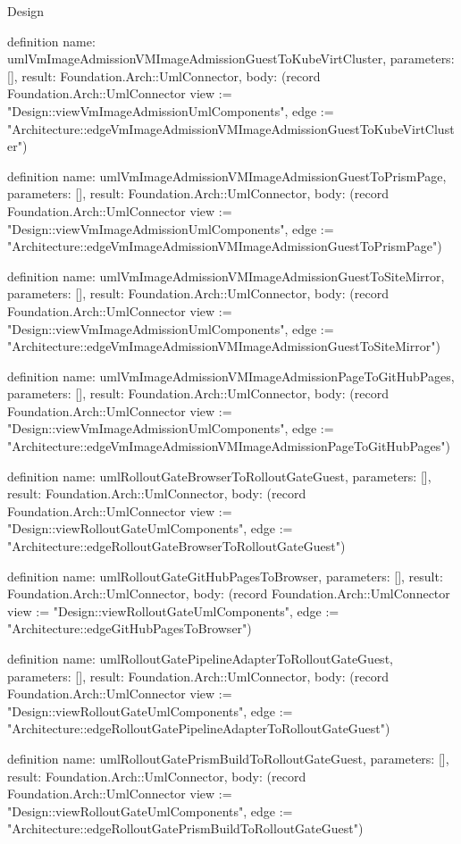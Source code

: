 \begin{lexlean}{Design}
\begin{semanticmodule}
definition{
  name: umlVmImageAdmissionVMImageAdmissionGuestToKubeVirtCluster,
  parameters: [],
  result: Foundation.Arch::UmlConnector,
  body: (record Foundation.Arch::UmlConnector {view := "Design::viewVmImageAdmissionUmlComponents", edge := "Architecture::edgeVmImageAdmissionVMImageAdmissionGuestToKubeVirtCluster"})
}

definition{
  name: umlVmImageAdmissionVMImageAdmissionGuestToPrismPage,
  parameters: [],
  result: Foundation.Arch::UmlConnector,
  body: (record Foundation.Arch::UmlConnector {view := "Design::viewVmImageAdmissionUmlComponents", edge := "Architecture::edgeVmImageAdmissionVMImageAdmissionGuestToPrismPage"})
}

definition{
  name: umlVmImageAdmissionVMImageAdmissionGuestToSiteMirror,
  parameters: [],
  result: Foundation.Arch::UmlConnector,
  body: (record Foundation.Arch::UmlConnector {view := "Design::viewVmImageAdmissionUmlComponents", edge := "Architecture::edgeVmImageAdmissionVMImageAdmissionGuestToSiteMirror"})
}

definition{
  name: umlVmImageAdmissionVMImageAdmissionPageToGitHubPages,
  parameters: [],
  result: Foundation.Arch::UmlConnector,
  body: (record Foundation.Arch::UmlConnector {view := "Design::viewVmImageAdmissionUmlComponents", edge := "Architecture::edgeVmImageAdmissionVMImageAdmissionPageToGitHubPages"})
}

definition{
  name: umlRolloutGateBrowserToRolloutGateGuest,
  parameters: [],
  result: Foundation.Arch::UmlConnector,
  body: (record Foundation.Arch::UmlConnector {view := "Design::viewRolloutGateUmlComponents", edge := "Architecture::edgeRolloutGateBrowserToRolloutGateGuest"})
}

definition{
  name: umlRolloutGateGitHubPagesToBrowser,
  parameters: [],
  result: Foundation.Arch::UmlConnector,
  body: (record Foundation.Arch::UmlConnector {view := "Design::viewRolloutGateUmlComponents", edge := "Architecture::edgeGitHubPagesToBrowser"})
}

definition{
  name: umlRolloutGatePipelineAdapterToRolloutGateGuest,
  parameters: [],
  result: Foundation.Arch::UmlConnector,
  body: (record Foundation.Arch::UmlConnector {view := "Design::viewRolloutGateUmlComponents", edge := "Architecture::edgeRolloutGatePipelineAdapterToRolloutGateGuest"})
}

definition{
  name: umlRolloutGatePrismBuildToRolloutGateGuest,
  parameters: [],
  result: Foundation.Arch::UmlConnector,
  body: (record Foundation.Arch::UmlConnector {view := "Design::viewRolloutGateUmlComponents", edge := "Architecture::edgeRolloutGatePrismBuildToRolloutGateGuest"})
}


\end{semanticmodule}
\end{lexlean}
